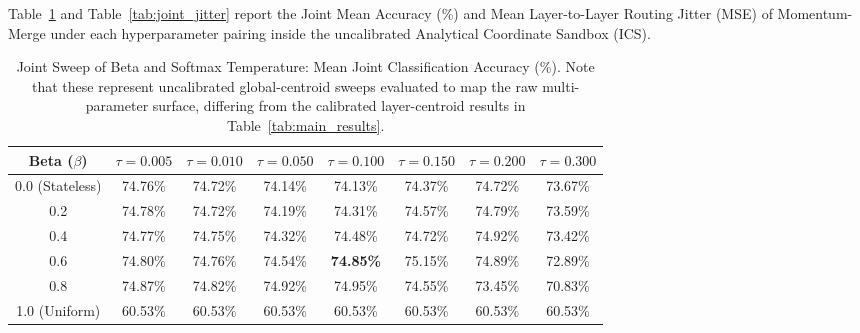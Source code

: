 \documentclass{article}
\theoremstyle{plain}
\theoremstyle{definition}
\theoremstyle{remark}
\begin{document}
Table~\ref{tab:joint_accuracy} and Table~\ref{tab:joint_jitter} report the Joint Mean Accuracy (\%) and Mean Layer-to-Layer Routing Jitter (MSE) of Momentum-Merge under each hyperparameter pairing inside the uncalibrated Analytical Coordinate Sandbox (ICS).

\begin{table}[h]
\centering
\caption{Joint Sweep of Beta and Softmax Temperature: Mean Joint Classification Accuracy (\%). Note that these represent uncalibrated global-centroid sweeps evaluated to map the raw multi-parameter surface, differing from the calibrated layer-centroid results in Table~\ref{tab:main_results}.}
\label{tab:joint_accuracy}
\vskip 0.1in
\begin{tabular}{cccccccc}
\toprule
\textbf{Beta} ($\beta$) & $\tau = 0.005$ & $\tau = 0.010$ & $\tau = 0.050$ & $\tau = 0.100$ & $\tau = 0.150$ & $\tau = 0.200$ & $\tau = 0.300$ \\
\midrule
0.0 (Stateless) & 74.76\% & 74.72\% & 74.14\% & 74.13\% & 74.37\% & 74.72\% & 73.67\% \\
0.2 & 74.78\% & 74.72\% & 74.19\% & 74.31\% & 74.57\% & 74.79\% & 73.59\% \\
0.4 & 74.77\% & 74.75\% & 74.32\% & 74.48\% & 74.72\% & 74.92\% & 73.42\% \\
0.6 & 74.80\% & 74.76\% & 74.54\% & \textbf{74.85\%} & 75.15\% & 74.89\% & 72.89\% \\
0.8 & 74.87\% & 74.82\% & 74.92\% & 74.95\% & 74.55\% & 73.45\% & 70.83\% \\
1.0 (Uniform) & 60.53\% & 60.53\% & 60.53\% & 60.53\% & 60.53\% & 60.53\% & 60.53\% \\
\bottomrule
\end{tabular}
\end{table}
\end{document}
